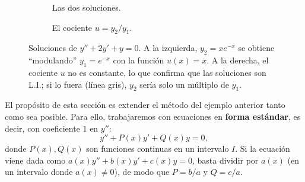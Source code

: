 \begin{figure}[h!]
    \centering
    \begin{subfigure}[b]{0.48\textwidth}
        \centering
        \caption{Las dos soluciones.}
    \end{subfigure}
    \hfill
    \begin{subfigure}[b]{0.48\textwidth}
        \centering
        \caption{El cociente $u=y_2/y_1$.}
    \end{subfigure}
    \caption{Soluciones de $y''+2y'+y=0$. A la izquierda, $y_2=xe^{-x}$ se obtiene ``modulando'' $y_1=e^{-x}$ con la funci\'on $u(x)=x$. A la derecha, el cociente $u$ no es constante, lo que confirma que las soluciones son L.I.; si lo fuera (l\'inea gris), $y_2$ ser\'ia solo un m\'ultiplo de $y_1$.}
    \label{fig:reduccion_raiz_doble}
\end{figure}

El prop\'osito de esta secci\'on es extender el m\'etodo del ejemplo anterior tanto como sea posible. Para ello, trabajaremos con ecuaciones en \textbf{forma est\'andar}, es decir, con coeficiente $1$ en $y''$:
\[
y''+P(x)y'+Q(x)y=0,
\]
donde $P(x),Q(x)$ son funciones continuas en un intervalo $I$. Si la ecuaci\'on viene dada como $a(x)y''+b(x)y'+c(x)y=0$, basta dividir por $a(x)$ (en un intervalo donde $a(x)\neq0$), de modo que $P=b/a$ y $Q=c/a$.

